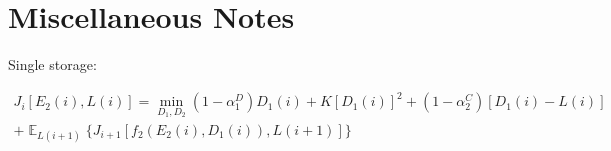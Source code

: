 \documentclass{article}
\begin{document}
	\section{Miscellaneous Notes}
	Single storage:
	
	\begin{multline}
	J_{i}[E_{2}(i),L(i)] = \min_{D_{1},D_{2}}
	(1-\alpha_{1}^{D})D_{1}(i) 
	+ K[D_{1}(i)]^{2}
	+(1-\alpha_{2}^{C})[D_{1}(i)-L(i)]\\
	+\mathop{\mathbb{E}}_{L(i+1)} \{J_{i+1}[f_{2}(E_{2}(i),D_{1}(i)),L(i+1)]\}
	\end{multline}
	
	
	
\end{document}
